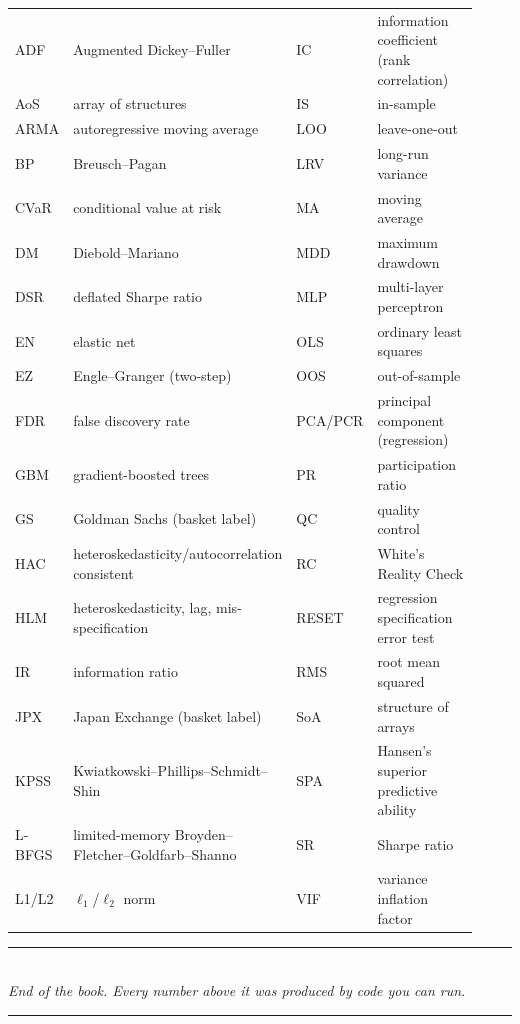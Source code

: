 \begin{center}
\renewcommand{\arraystretch}{1.3}
\small
\begin{tabular}{p{0.10\linewidth}p{0.36\linewidth}p{0.10\linewidth}p{0.36\linewidth}}
\toprule
ADF & Augmented Dickey--Fuller & IC & information coefficient (rank correlation) \\
AoS & array of structures & IS & in-sample \\
ARMA & autoregressive moving average & LOO & leave-one-out \\
BP & Breusch--Pagan & LRV & long-run variance \\
CVaR & conditional value at risk & MA & moving average \\
DM & Diebold--Mariano & MDD & maximum drawdown \\
DSR & deflated Sharpe ratio & MLP & multi-layer perceptron \\
EN & elastic net & OLS & ordinary least squares \\
EZ & Engle--Granger (two-step) & OOS & out-of-sample \\
FDR & false discovery rate & PCA/PCR & principal component (regression) \\
GBM & gradient-boosted trees & PR & participation ratio \\
GS & Goldman Sachs (basket label) & QC & quality control \\
HAC & heteroskedasticity/autocorrelation consistent & RC & White's Reality Check \\
HLM & heteroskedasticity, lag, mis-specification & RESET & regression specification error test \\
IR & information ratio & RMS & root mean squared \\
JPX & Japan Exchange (basket label) & SoA & structure of arrays \\
KPSS & Kwiatkowski--Phillips--Schmidt--Shin & SPA & Hansen's superior predictive ability \\
L-BFGS & limited-memory Broyden--Fletcher--Goldfarb--Shanno & SR & Sharpe ratio \\
L1/L2 & $\ell_1$/$\ell_2$ norm & VIF & variance inflation factor \\
\bottomrule
\end{tabular}
\end{center}

\vspace{1em}
\begin{center}
\rule{0.6\linewidth}{0.4pt}\\[4pt]
\emph{End of the book. Every number above it was produced by code you can run.}\\[4pt]
\rule{0.6\linewidth}{0.4pt}
\end{center}
